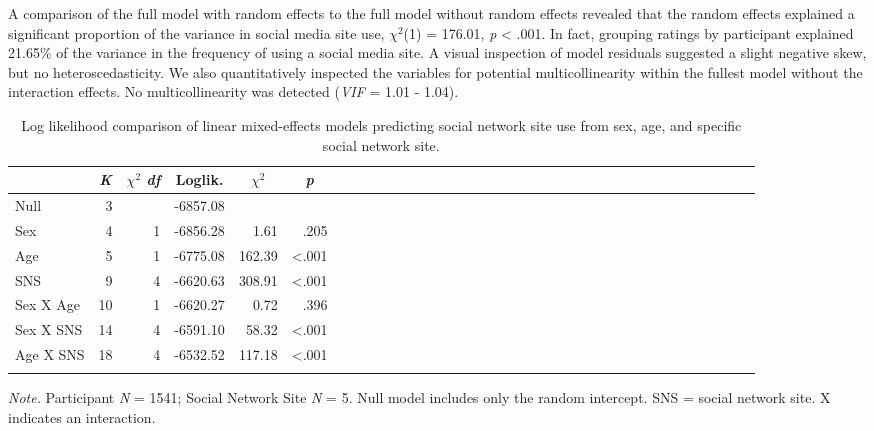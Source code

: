\documentclass[man, fleqn, noextraspace]{apa6}
\theoremstyle{definition}
\theoremstyle{definition}
\theoremstyle{definition}
\theoremstyle{remark}
\begin{document}
A comparison of the full model with random effects to the full model
without random effects revealed that the random effects explained a
significant proportion of the variance in social media site use,
\(\chi^2\)(1) = 176.01, \emph{p} \textless{} .001. In fact, grouping
ratings by participant explained 21.65\% of the variance in the
frequency of using a social media site. A visual inspection of model
residuals suggested a slight negative skew, but no heteroscedasticity.
We also quantitatively inspected the variables for potential
multicollinearity within the fullest model without the interaction
effects. No multicollinearity was detected (\emph{VIF} = 1.01 - 1.04).

\begin{table}[tbp]
\begin{center}
\begin{threeparttable}
\caption{\label{tab:df_lmer_table}Log likelihood comparison of linear mixed-effects models predicting social network site use from sex, age, and specific social network site.}
\begin{tabular}{lrrrrrlrrrrrlrrrrrlrrrrrlrrrrrlrrrrr}
\toprule
 & \multicolumn{1}{c}{\textit{K}} & \multicolumn{1}{c}{$\chi^2$ \textit{df}} & \multicolumn{1}{c}{Loglik.} & \multicolumn{1}{c}{$\chi^2$} & \multicolumn{1}{c}{\textit{p}}\\
\midrule
Null & 3 &  & -6857.08 &  & \\
Sex & 4 & 1 & -6856.28 & 1.61 & .205\\
Age & 5 & 1 & -6775.08 & 162.39 & <.001\\
SNS & 9 & 4 & -6620.63 & 308.91 & <.001\\
Sex X Age & 10 & 1 & -6620.27 & 0.72 & .396\\
Sex X SNS & 14 & 4 & -6591.10 & 58.32 & <.001\\
Age X SNS & 18 & 4 & -6532.52 & 117.18 & <.001\\
\bottomrule
\addlinespace
\end{tabular}
\begin{tablenotes}[para]
\normalsize{\textit{Note.} Participant \textit{N} = 1541; Social Network Site \textit{N} = 5. Null model includes only the random intercept. SNS = social network site. X indicates an interaction.}
\end{tablenotes}
\end{threeparttable}
\end{center}
\end{table}
\end{document}
